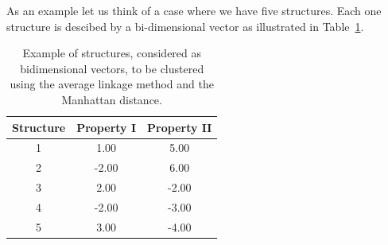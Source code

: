 



As  an   example  let  us  think   of  a  case  where   we  have  five
structures. Each one structure  is descibed by a bi-dimensional vector
as illustrated in Table~\ref{tab:data}.
\begin{table}
\centering
\begin{tabular}[h]{|c|c|c|}
\hline
Structure & Property I & Property II\\
\hline\hline
1  &     1.00  &  5.00 \\
\hline
2  &    -2.00  & 6.00 \\
\hline
3  &      2.00  & -2.00 \\
\hline
4  &     -2.00  & -3.00 \\
\hline
5  &     3.00  &  -4.00 \\
\hline 
\end{tabular}
\caption{Example of  structures, considered as  bidimensional vectors,
  to be clustered  using the average linkage method  and the Manhattan
  distance.}
\label{tab:data}
\end{table}

